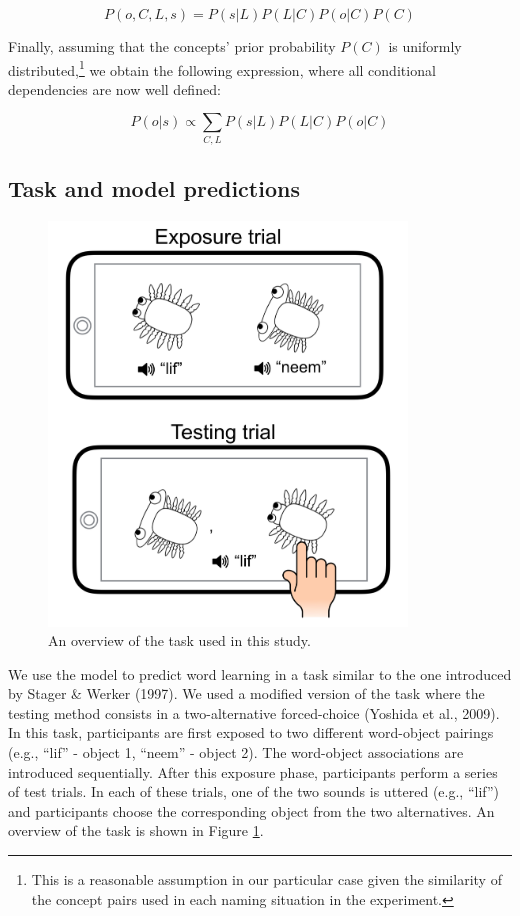 \documentclass[english,,man]{apa6}
\let\rmarkdownfootnote\footnote%
\def\footnote{\protect\rmarkdownfootnote}
\begin{document}
\[P(o,C,L,s) = P(s|L)P(L|C)P(o|C)P(C)\]

Finally, assuming that the concepts' prior probability \(P(C)\) is uniformly distributed,\footnote{This is a reasonable assumption in our particular case given the similarity of the concept pairs used in each naming situation in the experiment.} we obtain the following expression, where all conditional dependencies are now well defined:

\begin{equation} \label{eq:general}
P(o|s) \propto \sum_{C,L}  P(s|L)P(L|C)P(o|C)
\end{equation}

\hypertarget{task-and-model-predictions}{%
\subsection{Task and model predictions}\label{task-and-model-predictions}}

\begin{figure}[t]

{\centering \includegraphics[width=3.75in]{figs/task} 

}

\caption{An overview of the task used in this study.}\label{fig:task}
\end{figure}

We use the model to predict word learning in a task similar to the one introduced by Stager \& Werker (1997). We used a modified version of the task where the testing method consists in a two-alternative forced-choice (Yoshida et al., 2009). In this task, participants are first exposed to two different word-object pairings (e.g., \enquote{lif} - object 1, \enquote{neem} - object 2). The word-object associations are introduced sequentially. After this exposure phase, participants perform a series of test trials. In each of these trials, one of the two sounds is uttered (e.g., \enquote{lif}) and participants choose the corresponding object from the two alternatives. An overview of the task is shown in Figure \ref{fig:task}.
\end{document}
